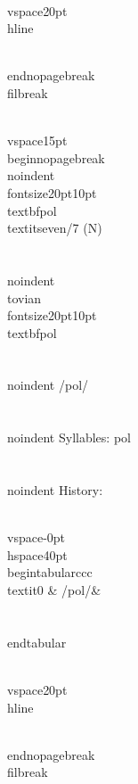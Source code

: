 \\vspace{20pt}\\hline

\\end{nopagebreak}
\\filbreak



\\vspace{15pt}
\\begin{nopagebreak}
\\noindent{\\fontsize{20pt}{10pt}\\textbf{pol} } \\textit{seven/7} (N)\\\\
\\noindent {\\tovian \\fontsize{20pt}{10pt} \\textbf{pol} }\\\\
\\noindent /p{\textprimstress}ol/\\\\
\\noindent Syllables: pol\\\\


\\noindent History:

\\vspace{-0pt}
\\hspace{40pt}
\\begin{tabular}{ccc}
\\textit{0} & /pol/& \\\\
\\end{tabular}

\\vspace{20pt}\\hline

\\end{nopagebreak}
\\filbreak



